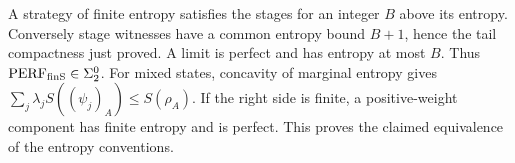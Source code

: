 A strategy of finite entropy satisfies the stages for an integer $B$ above its entropy. Conversely stage witnesses have a common entropy bound $B+1$, hence the tail compactness just proved. A limit is perfect and has entropy at most $B$. Thus $\mathrm{PERF}_{\mathrm{finS}}\in\Sigma^0_2$. For mixed states, concavity of marginal entropy gives $\sum_j\lambda_j S((\psi_j)_A)\leq S(\rho_A)$. If the right side is finite, a positive-weight component has finite entropy and is perfect. This proves the claimed equivalence of the entropy conventions.
